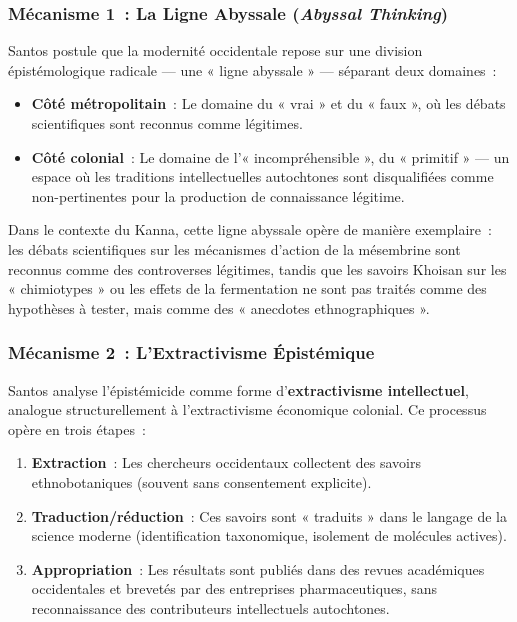 \documentclass[12pt,a4paper,twoside]{book}
\begin{document}
\subsubsection{Mécanisme 1~: La Ligne Abyssale (\textit{Abyssal Thinking})}

Santos postule que la modernité occidentale repose sur une division épistémologique radicale --- une « ligne abyssale » --- séparant deux domaines~:

\begin{itemize}
\item \textbf{Côté métropolitain}~: Le domaine du « vrai » et du « faux », où les débats scientifiques sont reconnus comme légitimes.

\item \textbf{Côté colonial}~: Le domaine de l'« incompréhensible », du « primitif » --- un espace où les traditions intellectuelles autochtones sont disqualifiées comme non-pertinentes pour la production de connaissance légitime.
\end{itemize}

Dans le contexte du Kanna, cette ligne abyssale opère de manière exemplaire~: les débats scientifiques sur les mécanismes d'action de la mésembrine sont reconnus comme des controverses légitimes, tandis que les savoirs Khoisan sur les « chimiotypes » ou les effets de la fermentation ne sont pas traités comme des hypothèses à tester, mais comme des « anecdotes ethnographiques ».

\subsubsection{Mécanisme 2~: L'Extractivisme Épistémique}

Santos analyse l'épistémicide comme forme d'\textbf{extractivisme intellectuel}, analogue structurellement à l'extractivisme économique colonial. Ce processus opère en trois étapes~:

\begin{enumerate}
\item \textbf{Extraction}~: Les chercheurs occidentaux collectent des savoirs ethnobotaniques (souvent sans consentement explicite).

\item \textbf{Traduction/réduction}~: Ces savoirs sont « traduits » dans le langage de la science moderne (identification taxonomique, isolement de molécules actives).

\item \textbf{Appropriation}~: Les résultats sont publiés dans des revues académiques occidentales et brevetés par des entreprises pharmaceutiques, sans reconnaissance des contributeurs intellectuels autochtones.
\end{enumerate}
\end{document}
